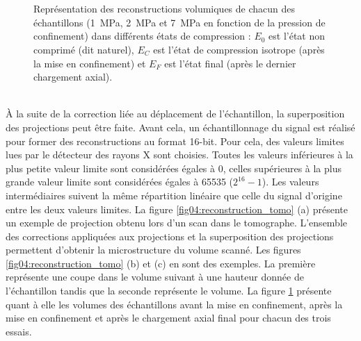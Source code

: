 		\begin{figure}\centering
			\hfill
			\hfill
			\\
			\hfill
			\hfill
			\\
			\hfill
			\hfill
			\caption{\label{fig04:samples_3D}Représentation des reconstructions volumiques de chacun des échantillons (\SI{1}{\mega\pascal}, \SI{2}{\mega\pascal} et \SI{7}{\mega\pascal} en fonction de la pression de confinement) dans différents états de compression : $E_0$ est l'état non comprimé (dit naturel), $E_C$ est l'état de compression isotrope (après la mise en confinement) et $E_F$ est l'état final (après le dernier chargement axial).}
		\end{figure}
		\\\`A la suite de la correction liée au déplacement de l'échantillon, la superposition des projections peut être faite. Avant cela, un échantillonnage du signal est réalisé pour former des reconstructions au format 16-bit. Pour cela, des valeurs limites lues par le détecteur des rayons X sont choisies. Toutes les valeurs inférieures à la plus petite valeur limite sont considérées égales à 0, celles supérieures à la plus grande valeur limite sont considérées égales à \num{65535} ($2^{16}-1$). Les valeurs intermédiaires suivent la même répartition linéaire que celle du signal d'origine entre les deux valeurs limites.
		La figure \ref{fig04:reconstruction_tomo} (a) présente un exemple de projection obtenu lors d'un scan dans le tomographe. L'ensemble des corrections appliquées aux projections et la superposition des projections permettent d'obtenir la microstructure du volume scanné. Les figures \ref{fig04:reconstruction_tomo} (b) et (c) en sont des exemples. La première représente une coupe dans le volume suivant à une hauteur donnée de l'échantillon tandis que la seconde représente le volume. La figure \ref{fig04:samples_3D} présente quant à elle les volumes des échantillons avant la mise en confinement, après la mise en confinement et après le chargement axial final pour chacun des trois essais.

